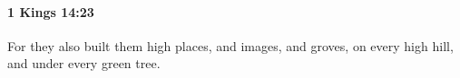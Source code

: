 
		\paragraph{1 Kings 14:23} %
			\label{1KINGS-14-23}

			For they also built them high places, and images, and groves, on every high hill, and under every green tree.


